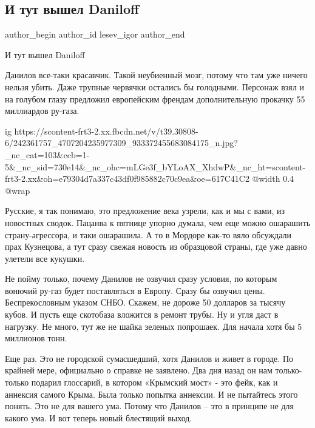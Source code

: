  
 
 
 
 
 
\subsection{И тут вышел Daniloff}
\label{sec:22_10_2021.fb.lesev_igor.1.danilov_aleksei}
 
\ifcmt
 author_begin
   author_id lesev_igor
 author_end
\fi

И тут вышел Daniloff

Данилов все-таки красавчик. Такой неубиенный мозг, потому что там уже ничего
нельзя убить. Даже трупные червячки остались бы голодными. Персонаж взял и на
голубом глазу предложил европейским френдам дополнительную прокачку 55
миллиардов ру-газа.

\ifcmt
  ig https://scontent-frt3-2.xx.fbcdn.net/v/t39.30808-6/242361757_4707204235977309_933372455683084175_n.jpg?_nc_cat=103&ccb=1-5&_nc_sid=730e14&_nc_ohc=mLGe3f_bYLoAX_XhdwP&_nc_ht=scontent-frt3-2.xx&oh=e79304d7a337c43df0f985882c70c9ea&oe=617C41C2
  @width 0.4
  @wrap 
\fi

Русские, я так понимаю, это предложение века узрели, как и мы с вами, из
новостных сводок. Пацанва к пятнице упорно думала, чем еще можно ошарашить
страну-агрессора, и таки ошарашила. А то в Мордоре как-то вяло обсуждали прах
Кузнецова, а тут сразу свежая новость из образцовой страны, где уже давно
улетели все кукушки.

Не пойму только, почему Данилов не озвучил сразу условия, по которым вонючий
ру-газ будет поставляться в Европу. Сразу бы озвучил цены. Беспрекословным
указом СНБО. Скажем, не дороже 50 долларов за тысячу кубов. И пусть еще
скотобаза вложится в ремонт трубы. Ну и угля даст в нагрузку. Не много, тут же
не шайка зеленых попрошаек. Для начала хотя бы 5 миллионов тонн.

Еще раз. Это не городской сумасшедший, хотя Данилов и живет в городе. По
крайней мере, официально о справке не заявлено. Два дня назад он нам
только-только подарил глоссарий, в котором «Крымский мост» - это фейк, как и
аннексия самого Крыма. Была только попытка аннексии. И не пытайтесь этого
понять. Это не для вашего ума. Потому что Данилов – это в принципе не для
какого ума. И вот теперь новый блестящий выход.

